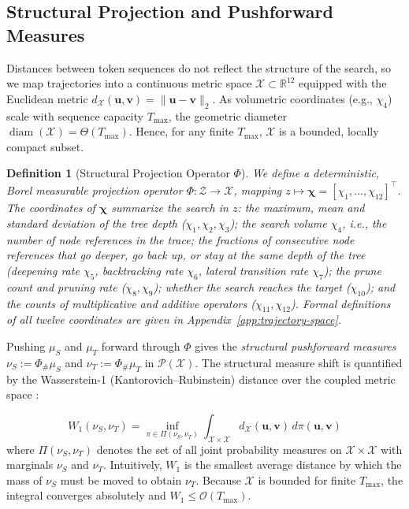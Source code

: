 \documentclass{article}
\newtheorem{definition}{Definition}
\begin{document}
\subsection{Structural Projection and Pushforward Measures}
\label{subsec:structural_projection}

Distances between token sequences do not reflect the structure of the search, so we map trajectories into a continuous metric space $\mathcal{X} \subset \mathbb{R}^{12}$ equipped with the Euclidean metric $d_{\mathcal{X}}(\boldsymbol{u}, \boldsymbol{v}) = \|\boldsymbol{u} - \boldsymbol{v}\|_2$. As volumetric coordinates (e.g., $\chi_4$) scale with sequence capacity $T_{\max}$, the geometric diameter $\operatorname{diam}(\mathcal{X}) = \Theta(T_{\max})$. Hence, for any finite $T_{\max}$, $\mathcal{X}$ is a bounded, locally compact subset.

\begin{definition}[Structural Projection Operator $\Phi$]
\label{def:structural_projection}
We define a deterministic, Borel measurable projection operator $\Phi: \mathcal{Z} \to \mathcal{X}$, mapping $z \mapsto \boldsymbol{\chi} =[\chi_1, \dots, \chi_{12}]^\top$. 
The coordinates of $\boldsymbol{\chi}$ summarize the search in $z$: the maximum, mean and standard deviation of the tree depth ($\chi_1,\chi_2,\chi_3$); the search volume $\chi_4$, i.e., the number of node references in the trace; the fractions of consecutive node references that go deeper, go back up, or stay at the same depth of the tree (deepening rate $\chi_5$, backtracking rate $\chi_6$, lateral transition rate $\chi_7$); the prune count and pruning rate ($\chi_8,\chi_9$); whether the search reaches the target ($\chi_{10}$); and the counts of multiplicative and additive operators ($\chi_{11},\chi_{12}$). Formal definitions of all twelve coordinates are given in Appendix~\ref{app:trajectory-space}. %
\end{definition}

Pushing $\mu_S$ and $\mu_T$ forward through $\Phi$ gives the \textit{structural pushforward measures} $\nu_S := \Phi_\# \mu_S$ and $\nu_T := \Phi_\# \mu_T$ in $\mathcal{P}(\mathcal{X})$. The structural measure shift is quantified by the Wasserstein-1 (Kantorovich--Rubinstein) distance over the coupled metric space \citep{Villani2009}: %

\begin{equation}
    W_1(\nu_S, \nu_T) = \inf_{\pi \in \Pi(\nu_S, \nu_T)} \int_{\mathcal{X} \times \mathcal{X}} d_{\mathcal{X}}(\boldsymbol{u}, \boldsymbol{v}) \, d\pi(\boldsymbol{u}, \boldsymbol{v})
\end{equation}
where $\Pi(\nu_S, \nu_T)$ denotes the set of all joint probability measures on $\mathcal{X} \times \mathcal{X}$ with marginals $\nu_S$ and $\nu_T$. Intuitively, $W_1$ is the smallest average distance by which the mass of $\nu_S$ must be moved to obtain $\nu_T$. Because $\mathcal{X}$ is bounded for finite $T_{\max}$, the integral converges absolutely and $W_1 \le \mathcal{O}(T_{\max})$.
\end{document}
